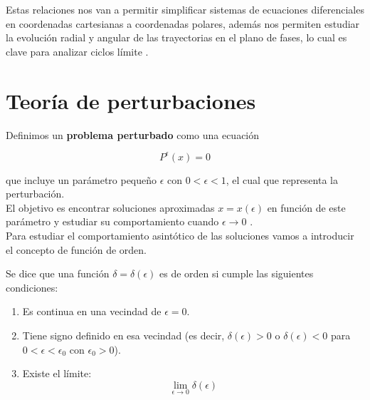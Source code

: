 Estas relaciones nos van a permitir simplificar sistemas de ecuaciones diferenciales en coordenadas cartesianas a coordenadas polares, además nos permiten estudiar la evolución radial y angular de las trayectorias en el plano de fases, lo cual es clave para analizar ciclos límite \cite{perko2001differential}.\\

\newpage

\section{Teoría de perturbaciones}

Definimos un \textbf{problema perturbado} como una ecuación 

\begin{equation}\label{eq: problemaPerturbado}
	P^\epsilon\left(x\right)=0
\end{equation}

que incluye un parámetro pequeño $\epsilon$ con $0<\epsilon<1$, el cual que representa la perturbación.\\

El objetivo es encontrar soluciones aproximadas $x=x\left(\epsilon\right)$ en función de este parámetro y estudiar su comportamiento cuando $\epsilon\to0$ \cite{hinch1991perturbation}.\\

Para estudiar el comportamiento asintótico de las soluciones vamos a introducir el concepto de función de orden.

\begin{definition}
	Se dice que una función $\delta=\delta\left(\epsilon\right)$ es de orden si cumple las siguientes condiciones:
	\begin{enumerate}
		\item Es continua en una vecindad de $\epsilon=0$.
		\item Tiene signo definido en esa vecindad (es decir, $\delta(\epsilon)>0$ o $\delta(\epsilon)<0$ para $0<\epsilon<\epsilon_0$ con $\epsilon_0>0$).
		\item Existe el límite:
		$$\displaystyle\lim_{\epsilon\to0}\delta\left(\epsilon\right)$$
	\end{enumerate}
\end{definition}

